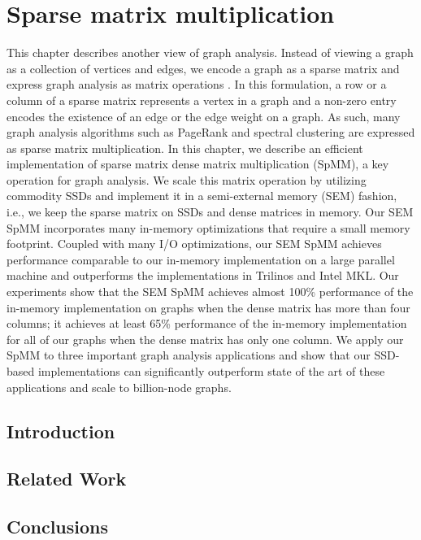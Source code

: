 \chapter{Sparse matrix multiplication}
\label{sec:fe}

This chapter describes another view of graph analysis. Instead of viewing
a graph as a collection of vertices and edges, we encode a graph as
a sparse matrix and express graph analysis as matrix operations \cite{Mattson13}.
In this formulation, a row or a column of a sparse matrix represents a vertex
in a graph and a non-zero entry encodes the existence of an edge or the edge
weight on a graph. As such, many graph analysis algorithms such as PageRank
and spectral clustering are expressed as sparse matrix multiplication.
In this chapter, we describe an efficient implementation of sparse matrix
dense matrix multiplication (SpMM), a key operation for graph analysis. We
scale this matrix operation by utilizing commodity SSDs and implement it in
a semi-external memory (SEM) fashion, i.e., we keep the sparse matrix on SSDs
and dense matrices in memory. Our SEM SpMM incorporates many in-memory
optimizations that require a small memory footprint.
Coupled with many I/O optimizations, our SEM SpMM achieves performance
comparable to our in-memory implementation on a large parallel machine and
outperforms the implementations in Trilinos and Intel MKL.
Our experiments show that the SEM SpMM achieves almost 100\% performance
of the in-memory implementation on graphs when the dense matrix has more
than four columns; it achieves at least 65\% performance of the in-memory
implementation for all of our graphs when the dense matrix has only one column.
We apply our SpMM to three important graph analysis applications and show that
our SSD-based implementations can significantly outperform state of the art
of these applications and scale to billion-node graphs.

\section{Introduction}


\section{Related Work}






\section{Conclusions}

